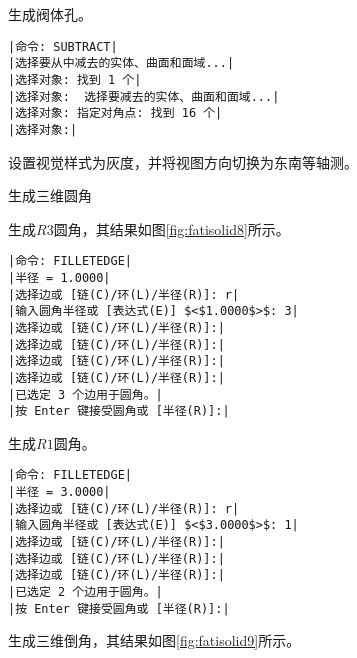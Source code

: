 \begin{procedure}
\item 生成阀体孔。
\begin{lstlisting}
|命令: SUBTRACT|
|选择要从中减去的实体、曲面和面域...|
|选择对象: 找到 1 个|
|选择对象:  选择要减去的实体、曲面和面域...|
|选择对象: 指定对角点: 找到 16 个|
|选择对象:|
\end{lstlisting}
\item 设置视觉样式为灰度，并将视图方向切换为东南等轴测。
\item 生成三维圆角

生成$R3$圆角，其结果如图\ref{fig:fatisolid8}所示。
\begin{lstlisting}
|命令: FILLETEDGE|
|半径 = 1.0000|
|选择边或 [链(C)/环(L)/半径(R)]: r|
|输入圆角半径或 [表达式(E)] $<$1.0000$>$: 3|
|选择边或 [链(C)/环(L)/半径(R)]:|
|选择边或 [链(C)/环(L)/半径(R)]:|
|选择边或 [链(C)/环(L)/半径(R)]:|
|选择边或 [链(C)/环(L)/半径(R)]:|
|已选定 3 个边用于圆角。|
|按 Enter 键接受圆角或 [半径(R)]:|
\end{lstlisting}
生成$R1$圆角。
\begin{lstlisting}
|命令: FILLETEDGE|
|半径 = 3.0000|
|选择边或 [链(C)/环(L)/半径(R)]: r|
|输入圆角半径或 [表达式(E)] $<$3.0000$>$: 1|
|选择边或 [链(C)/环(L)/半径(R)]:|
|选择边或 [链(C)/环(L)/半径(R)]:|
|选择边或 [链(C)/环(L)/半径(R)]:|
|已选定 2 个边用于圆角。|
|按 Enter 键接受圆角或 [半径(R)]:|
\end{lstlisting}
\item 生成三维倒角，其结果如图\ref{fig:fatisolid9}所示。


\end{procedure}
